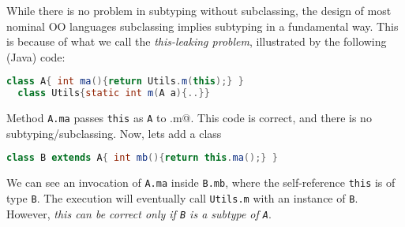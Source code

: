 While there is no problem in subtyping without subclassing, the design
of most nominal OO languages subclassing implies subtyping in a
fundamental way. This is because of what we call the
\emph{this-leaking problem}, illustrated by the following
(Java) code:
\saveSpace
\begin{lstlisting}[language=Java]
  class A{ int ma(){return Utils.m(this);} }
  class Utils{static int m(A a){..}}
\end{lstlisting}
\saveSpace
Method \lstinline{A.ma} passes \lstinline{this} as \lstinline{A} to \Q@Utils.m@.
This code is correct, and there is no subtyping/subclassing.  Now, lets add a class \Q@B@
\saveSpace
\begin{lstlisting}[language=Java]
  class B extends A{ int mb(){return this.ma();} }  
\end{lstlisting}
\saveSpace
\noindent We can see an invocation of \lstinline{A.ma} inside
\lstinline{B.mb}, where the self-reference \lstinline{this} is of type \lstinline{B}. 
The execution will eventually call \lstinline{Utils.m} with an
instance of \lstinline{B}. However, \emph{this can be correct only if \lstinline{B} is a subtype of
\lstinline{A}}. 

%
%


